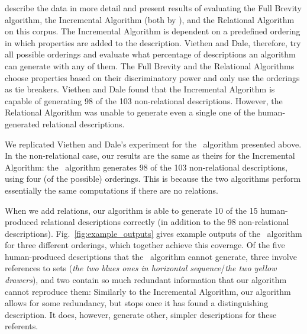  describe the data in
more detail and present results of evaluating the Full Brevity
algorithm, the Incremental Algorithm (both by ), and
the Relational Algorithm \cite{dale91:_gener_refer_expres_invol_relat}
on this corpus. The Incremental Algorithm is dependent on a predefined
ordering in which properties are added to the description. Viethen and
Dale, therefore, try all possible orderings and evaluate what
percentage of descriptions an algorithm can generate with any of
them. The Full Brevity and the Relational Algorithms choose properties
based on their discriminatory power and only use the orderings as tie
breakers. Viethen and Dale found that the Incremental Algorithm is
capable of generating 98 of the 103 non-relational
descriptions. However, the Relational Algorithm was unable to
generate even a single one of the human-generated relational
descriptions.




We replicated Viethen and Dale's experiment for the \el\ algorithm
presented above. In the non-relational case, our results are the same
as theirs for the Incremental Algorithm: the \el\ algorithm generates
98 of the 103 non-relational descriptions, using four (of the
possible) orderings.  This is because the two algorithms perform
essentially the same computations if there are no relations.



When we add relations, our algorithm is able to generate 10 of the 15
human-produced relational descriptions correctly (in addition to the
98 non-relational descriptions).  Fig.~\ref{fig:example_outputs} gives
example outputs of the \el\ algorithm for three different orderings,
which together achieve this coverage.  Of the five human-produced
descriptions that the \el\ algorithm cannot generate, three involve
references to sets (\textit{the two blues ones in horizontal
sequence}/\textit{the two yellow drawers}), and two contain so much
redundant information that our algorithm cannot reproduce them:
Similarly to the Incremental Algorithm, our algorithm allows for some
redundancy, but stops once it has found a distinguishing
description. It does, however, generate other, simpler descriptions
for these referents.

